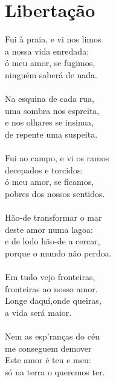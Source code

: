 \documentclass{article}
\begin{document}
\section{ Libertação}
Fui à praia, e vi nos limos\\
a nossa vida enredada:\\
ó meu amor, se fugimos,\\
ninguém saberá de nada.\\
\\
Na esquina de cada rua,\\
uma sombra nos espreita,\\
e nos olhares se insinua,\\
de repente uma suspeita.\\
\\
Fui ao campo, e vi os ramos\\
decepados e torcidos:\\
ó meu amor, se ficamos,\\
pobres dos nossos sentidos.\\
\\
Hão-de transformar o mar\\
deste amor numa lagoa:\\
e de lodo hão-de a cercar,\\
porque o mundo não perdoa.\\
\\
Em tudo vejo fronteiras,\\
fronteiras ao nosso amor.\\
Longe daquí,onde queiras,\\
a vida será maior.\\
\\
Nem as esp'ranças do céu\\
me conseguem demover\\
Este amor é teu e meu:\\
só na terra o queremos ter.\\
\\
\\
\end{document}
